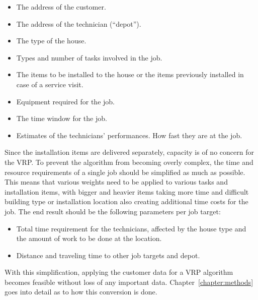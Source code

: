 \begin{itemize}
\item The address of the customer.
\item The address of the technician (``depot'').
\item The type of the house.
\item Types and number of tasks involved in the job.
\item The items to be installed to the house or the items previously installed in case of a service visit.
\item Equipment required for the job.
\item The time window for the job.
\item Estimates of the technicians' performances. How fast they are at the job.
\end{itemize}

Since the installation items are delivered separately, capacity is of no concern for the VRP. To prevent the algorithm from becoming overly complex, the time and resource requirements of a single job should be simplified as much as possible. This means that various weights need to be applied to various tasks and installation items, with bigger and heavier items taking more time and difficult building type or installation location also creating additional time costs for the job. The end result should be the following parameters per job target:

\begin{itemize}
\item Total time requirement for the technicians, affected by the house type and the amount of work to be done at the location.
\item Distance and traveling time to other job targets and depot. 
\end{itemize}

With this simplification, applying the customer data for a VRP algorithm becomes feasible without loss of any important data. Chapter~\ref{chapter:methods} goes into detail as to how this conversion is done.

